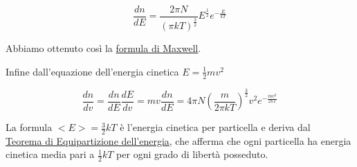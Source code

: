 \begin{equation} \label{formula_maxwell}
\frac{dn}{dE} = \frac{2 \pi N}{(\pi k T)^\frac{3}{2}} E^\frac{1}{2} e^{-\frac{E}{k T}}
\end{equation}

Abbiamo ottenuto così la \underline{formula di Maxwell}.

Infine dall'equazione dell'energia cinetica $E = \frac{1}{2} m v^2$

\begin{equation}
\frac{dn}{dv} = \frac{dn}{dE} \frac{dE}{dv} = mv \frac{dn}{dE} = 4 \pi N (\frac{m}{2 \pi k T})^\frac{3}{2} v^2 e^{- \frac{m v^2}{2 k T}}
\end{equation}

La formula $<E> = \frac{3}{2} k T $ è l'energia cinetica per particella e deriva dal \\
\underline{Teorema di Equipartizione dell'energia}, 
che afferma che ogni particella ha energia cinetica media pari a $\frac{1}{2} k T$ per ogni grado di libertà posseduto.


















